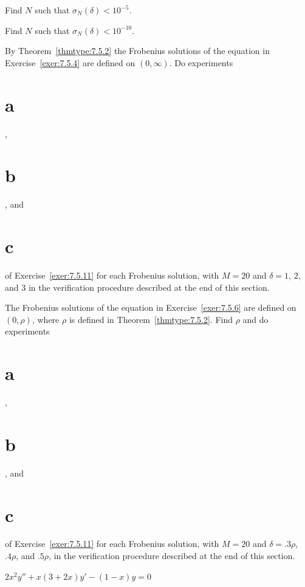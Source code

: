 \begin{exerciselist}
\begin{alist}
    \item %
    Find $N$ such that $\sigma_{N}(\delta)<10^{-5}$.

    \item %
    Find $N$ such that $\sigma_{N}(\delta)<10^{-10}$.
  \end{alist}

  \item\label{exer:7.5.12} \Lex By Theorem~\ref{thmtype:7.5.2} the Frobenius solutions of the
        equation in Exercise~\ref{exer:7.5.4} are defined on $(0,\infty)$. Do experiments \part{a},
        \part{b}, and \part{c} of Exercise~\ref{exer:7.5.11} for each Frobenius solution, with
        $M=20$ and $\delta=1$, $2$, and $3$ in the verification procedure described at the end of
        this section.

  \item\label{exer:7.5.13} \Lex The Frobenius solutions of the equation in Exercise~\ref{exer:7.5.6}
        are defined on $(0,\rho)$, where $\rho$ is defined in Theorem~\ref{thmtype:7.5.2}. Find
        $\rho$ and do experiments \part{a}, \part{b}, and \part{c} of Exercise~\ref{exer:7.5.11} for
        each Frobenius solution, with $M=20$ and $\delta=.3\rho$, $.4\rho$, and $.5\rho$, in the
        verification procedure described at the end of this section.


  \item\label{exer:7.5.14} $2x^{2}y''+x(3+2x)y'-(1-x)y=0$


\end{exerciselist}
